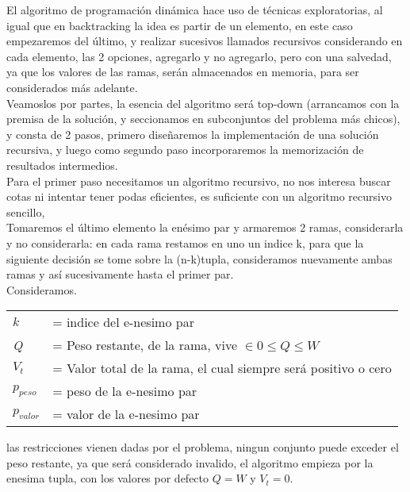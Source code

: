 \documentclass[fleqn, 11pt]{article}
\begin{document}
El algoritmo de programación dinámica hace uso de técnicas exploratorias, al igual que en backtracking la idea es
partir de un elemento, en este caso empezaremos del último, y realizar sucesivos llamados recursivos considerando
en cada elemento, las 2 opciones, agregarlo y no agregarlo, pero con una salvedad, ya que los valores de las ramas,
serán almacenados en memoria, para ser considerados más adelante. \\

Veamoslos por partes, la esencia del algoritmo será top-down (arrancamos con la premisa de la solución, y seccionamos
en subconjuntos del problema más chicos), y consta de 2 pasos, primero diseñaremos la implementación de una solución
recursiva, y luego como segundo paso incorporaremos la memorización de resultados intermedios.  \\

Para el primer paso necesitamos un algoritmo recursivo, no nos interesa buscar cotas ni intentar tener podas eficientes,
es suficiente con un algoritmo recursivo sencillo,  \\

Tomaremos el último elemento la enésimo par y armaremos 2 ramas, considerarla y no considerarla: en cada rama restamos
en uno un indice k, para que la siguiente decisión se tome sobre la (n-k)tupla, consideramos nuevamente ambas ramas y
así sucesivamente hasta el primer par.\\

Consideramos.\\
\begin{tabular}{l l}
    \textit{$k$} & = indice del e-nesimo par  \\
    \textit{Q} & = Peso restante, de la rama, vive $ \in 0 \leq \textit{Q} \leq W $  \\
    \textit{$V_t$} & = Valor total de la rama, el cual siempre será positivo o cero  \\
    \textit{$p_{peso}$} & = peso de la e-nesimo par  \\
    \textit{$p_{valor}$} & = valor de la e-nesimo par  \\

\end{tabular}

las restricciones vienen dadas por el problema, ningun conjunto puede exceder el peso restante, ya que será considerado
invalido, el algoritmo empieza por la enesima tupla, con los valores por defecto $Q = W$ y $V_t = 0$. \\
\end{document}
